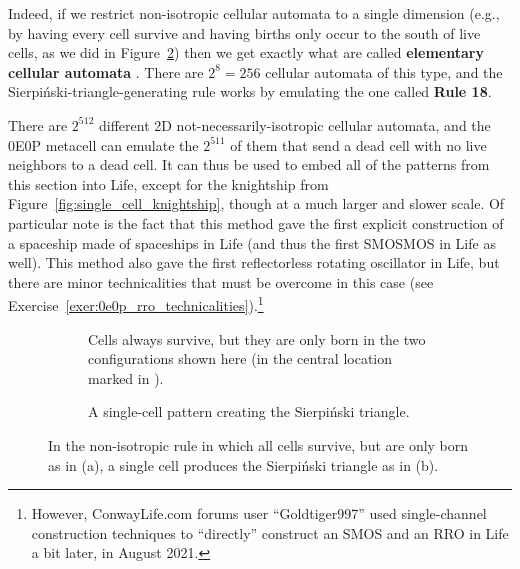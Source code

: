 Indeed, if we restrict non-isotropic cellular automata to a single dimension (e.g., by having every cell survive and having births only occur to the south of live cells, as we did in Figure~\ref{fig:single_cell_sierpinski}) then we get exactly what are called \textbf{elementary cellular automata} \cite{Wolfram2002}. There are $2^8 = 256$ cellular automata of this type, and the Sierpi\'{n}ski-triangle-generating rule works by emulating the one called \textbf{Rule 18}.

There are $2^{512}$ different 2D not-necessarily-isotropic cellular automata, and the 0E0P metacell can emulate the $2^{511}$ of them that send a dead cell with no live neighbors to a dead cell. It can thus be used to embed all of the patterns from this section into Life, except for the knightship from Figure~\ref{fig:single_cell_knightship}, though at a much larger and slower scale. Of particular note is the fact that this method gave the first explicit construction of a spaceship made of spaceships in Life (and thus the first SMOSMOS in Life as well). This method also gave the first reflectorless rotating oscillator in Life, but there are minor technicalities that must be overcome in this case (see Exercise~\ref{exer:0e0p_rro_technicalities}).\footnote{However, ConwayLife.com forums user ``Goldtiger997'' used single-channel construction techniques to ``directly'' construct an SMOS and an RRO in Life a bit later, in August 2021.}

\begin{figure}[!htb]
	\centering
	\begin{subfigure}{.42\textwidth}
		\centering
		\caption{Cells always survive, but they are only born in the two configurations shown here (in the central location marked in ).}
		\label{fig:non_iso_rule_18}
	\end{subfigure} \hfill \begin{subfigure}{.53\textwidth}
		\centering
		\caption{A single-cell pattern creating the Sierpi\'{n}ski triangle.}
		\label{fig:single_cell_sierpinski}
	\end{subfigure}
	\caption{In the non-isotropic rule in which all cells survive, but are only born as in (a), a single cell produces the Sierpi\'{n}ski triangle as in (b).}\label{fig:single_cell_weird}
\end{figure}


